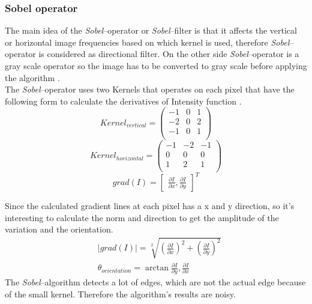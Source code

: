 \documentclass[journal,final,a4paper,twoside]{PS}
\begin{document}
\subsubsection{Sobel operator}
The main idea of the \emph{Sobel}--operator or \emph{Sobel}--filter is that it affects the vertical or horizontal image frequencies based on which kernel is used, therefore \emph{Sobel}--operator is considered as directional filter. On the other side \emph{Sobel}--operator is a gray scale operator so the image has to be converted to gray scale before applying the algorithm \cite{Langaniere}.
\\
The \emph{Sobel}--operator uses two Kernels that operates on each pixel that have the following form to calculate the derivatives of Intensity function \cite{Langaniere}.
\begin{equation}
Kernel_{vertical}=\begin{pmatrix}
-1&0&1\\
-2&0&2\\
-1&0&1\\
\end{pmatrix}
\end{equation}
\begin{equation}
Kernel_{horizontal}=\begin{pmatrix}
-1&-2&-1\\
0&0&0\\
1&2&1\\
\end{pmatrix}
\end{equation}
\begin{equation}
grad(I)=\begin{bmatrix}
\frac{\partial I}{\partial x},\frac{\partial I}{\partial y}
\end{bmatrix}^T
\end{equation}


Since the calculated gradient lines at each pixel has a x and y direction, so it's interesting to calculate the norm and direction to get the amplitude of the variation and the orientation.
\begin{align}
&|grad(I)|=\sqrt[2]{\left(\frac{\partial I}{\partial x}\right)^2+\left(\frac{\partial I}{\partial y}\right)^2}\\
&\theta_{orientation}=\arctan{\frac{\partial I}{\partial y},\frac{\partial I}{\partial x}}
\end{align}
The \emph{Sobel}--algorithm detects a lot of edges, which are not the actual edge because of the small kernel. Therefore the algorithm's results are noisy. 
\end{document}
